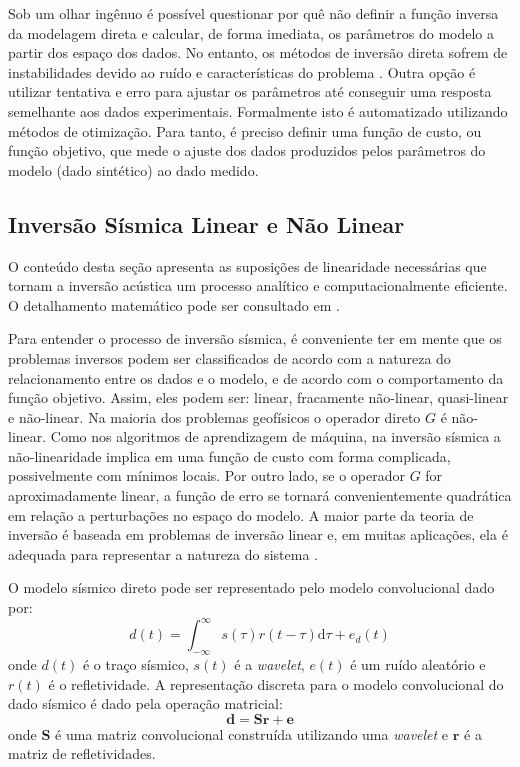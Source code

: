 {Sob um olhar ingênuo é possível questionar por quê não definir a
função inversa da modelagem direta e calcular, de forma imediata,
os parâmetros do modelo a partir dos espaço dos dados.
No entanto, os métodos de inversão direta sofrem de instabilidades
devido ao ruído e características do problema \citep[p. 50]{sen_livro}. Outra
opção é utilizar tentativa e erro para ajustar os parâmetros até conseguir uma
resposta semelhante aos dados experimentais. Formalmente isto é automatizado
utilizando métodos de otimização. Para tanto, é preciso definir uma função de
custo, ou função objetivo, que mede o ajuste dos dados produzidos pelos
parâmetros do modelo (dado sintético) ao dado medido.

\subsection{Inversão Sísmica Linear e Não Linear}
O conteúdo desta seção apresenta as suposições de linearidade necessárias
que tornam a inversão acústica um processo analítico e computacionalmente
eficiente. O detalhamento matemático pode ser consultado em \cite{Figueiredo2014}.

Para entender o processo de inversão sísmica, é conveniente ter em mente
que os problemas inversos podem ser classificados de acordo com a natureza
do relacionamento entre os dados e o modelo, e de acordo com o comportamento da função objetivo.
Assim, eles podem ser: linear, fracamente não-linear, quasi-linear e não-linear.
Na maioria dos problemas geofísicos o operador direto $G$ é não-linear.
Como nos algoritmos de aprendizagem de máquina, na inversão sísmica
a não-linearidade implica em uma função de custo com forma complicada,
possivelmente com mínimos locais.
Por outro lado, se o operador $G$ for aproximadamente linear, a
função de erro se tornará convenientemente quadrática em relação a perturbações
no espaço do modelo. A maior parte da teoria de inversão é baseada em problemas
de inversão linear e, em muitas aplicações, ela é 
adequada para representar a natureza do sistema \cite{sen_livro}.

O modelo sísmico direto pode ser representado pelo modelo convolucional dado por:
\begin{equation}
d(t) = \int_{-\infty}^{\infty} s(\tau) r(t - \tau)\mathrm{d}\tau + e_{d}(t)
\label{eq:conmodel}
\end{equation}
onde $d(t)$ é o traço sísmico, $s(t)$ é a \textit{wavelet}, $e(t)$ é
um ruído aleatório e $r(t)$ é o refletividade.
A representação discreta para o modelo convolucional do dado sísmico é
dado pela operação matricial: 
\begin{equation}
\label{eq:sismDiscreta}
\mathbf{d = Sr + e}
\end{equation}
onde $\mathbf{S}$ é uma matriz convolucional construída utilizando uma
\textit{wavelet} e $\mathbf{r}$  é a matriz de refletividades.

}
